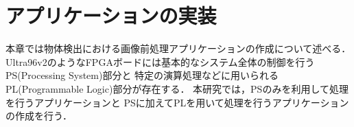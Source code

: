 \documentclass[11pt,a4j]{jreport}
\begin{document}
%
\chapter{アプリケーションの実装}
本章では物体検出における画像前処理アプリケーションの作成について述べる．
Ultra96v2のようなFPGAボードには基本的なシステム全体の制御を行うPS(Processing System)部分と
特定の演算処理などに用いられるPL(Programmable Logic)部分が存在する．
本研究では，PSのみを利用して処理を行うアプリケーションと
PSに加えてPLを用いて処理を行うアプリケーションの作成を行う．
\end{document}
